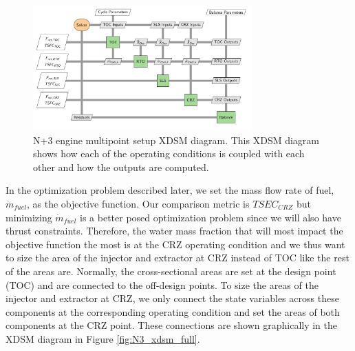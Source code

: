 \documentclass[conf]{new-aiaa}
\begin{document}
\begin{figure}[hbt!]
    \centering
    \includegraphics[width=0.75\textwidth]{N3_xdsm.pdf}
    \caption{
        N+3 engine multipoint setup XDSM diagram.
        This XDSM diagram shows how each of the operating conditions is coupled with each other and how the outputs are computed.
    }
    \label{fig:N3_xdsm}
\end{figure}

In the optimization problem described later, we set the mass flow rate of fuel, $\dot{m}_{fuel}$, as the objective function.
Our comparison metric is $TSEC_{CRZ}$ but minimizing $\dot{m}_{fuel}$ is a better posed optimization problem since we will also have thrust constraints.
Therefore, the water mass fraction that will most impact the objective function the most is at the CRZ operating condition and we thus want to size the area of the injector and extractor at CRZ instead of TOC like the rest of the areas are.
Normally, the cross-sectional areas are set at the design point (TOC) and are connected to the off-design points.
To size the areas of the injector and extractor at CRZ, we only connect the state variables across these components at the corresponding operating condition and set the areas of both components at the CRZ point.
These connections are shown graphically in the XDSM diagram in Figure \ref{fig:N3_xdsm_full}.
\end{document}
